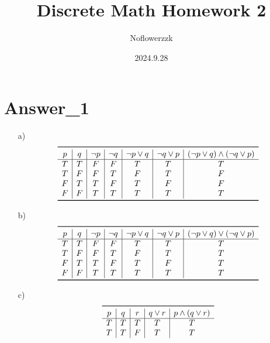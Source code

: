 \documentclass{article}
\title{Discrete Math Homework 2}
\author{Noflowerzzk}
\date{2024.9.28}
\begin{document}
\maketitle

\section{Answer\_1}

\renewcommand{\arraystretch}{1} %

\begin{itemize}
    \item[a)] 
        \[
            \begin{array}{c|c|c|c|c|c|c}
                \toprule
                p & q & \neg p & \neg q & \neg p \lor q & \neg q \lor p & (\neg p \lor q) \land (\neg q \lor p) \\
                \hline
                T & T & F & F & T & T & T \\
                T & F & F & T & F & T & F \\
                F & T & T & F & T & F & F \\
                F & F & T & T & T & T & T \\
                \bottomrule
            \end{array}
        \]
    \item[b)]
        \[
            \begin{array}{c|c|c|c|c|c|c}
                \toprule
                p & q & \neg p & \neg q & \neg p \lor q & \neg q \lor p & (\neg p \lor q) \lor (\neg q \lor p) \\
                \hline
                T & T & F & F & T & T & T \\
                T & F & F & T & F & T & T \\
                F & T & T & F & T & F & T \\
                F & F & T & T & T & T & T \\
                \bottomrule
            \end{array}
        \]
    \item[c)]
        \[
            \begin{array}{c|c|c|c|c}
                \toprule
                p & q & r & q \lor r & p \land (q \lor r) \\
                \hline
                T & T & T & T & T \\
                T & T & F & T & T \\

\end{array}\]
\end{itemize}
\end{document}
